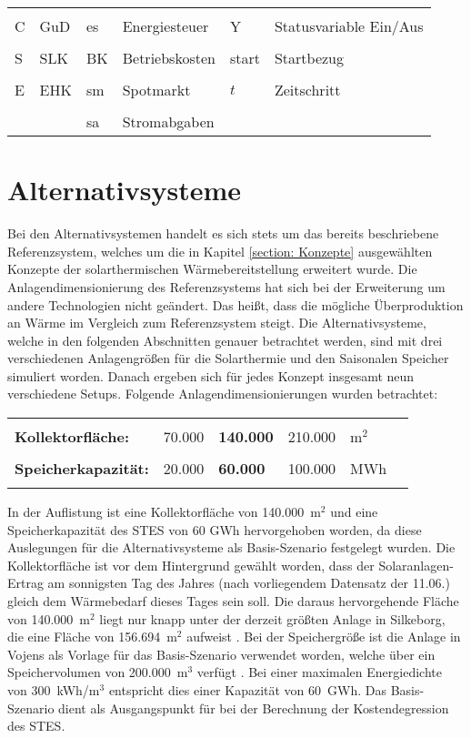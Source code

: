 	\begin{tabular}{llllll}
		&&&&&  \tabularnewline
		C & \acl{GuD} & es & Energiesteuer & Y & Statusvariable Ein/Aus\tabularnewline
		&&&&& \tabularnewline
		S & \acl{SLK} & BK & Betriebskosten & start & Startbezug\tabularnewline
		&&&&& \tabularnewline
		E & \acl{EHK} & sm & Spotmarkt & $t$ & Zeitschritt \tabularnewline
		&&&&&  \tabularnewline
		&  & sa & Stromabgaben &  & \tabularnewline
	\end{tabular}

\section{Alternativsysteme}
Bei den Alternativsystemen handelt es sich stets um das bereits beschriebene Referenzsystem, welches um die in Kapitel \ref{section: Konzepte} ausgewählten Konzepte der solarthermischen Wärmebereitstellung erweitert wurde. Die Anlagendimensionierung des Referenzsystems hat sich bei der Erweiterung um andere Technologien nicht geändert. Das heißt, dass die mögliche Überproduktion an Wärme im Vergleich zum Referenzsystem steigt. Die Alternativsysteme, welche in den folgenden Abschnitten genauer betrachtet werden, sind mit drei verschiedenen Anlagengrößen für die Solarthermie und den Saisonalen Speicher simuliert worden. Danach ergeben sich für jedes Konzept insgesamt neun verschiedene Setups. Folgende Anlagendimensionierungen wurden betrachtet:

	\begin{tabular}{llllll}
		&&&&&  \tabularnewline
		\textbf{Kollektorfläche:} & 70.000 & \textbf{140.000} & 210.000 & m$^2$  \tabularnewline
		&&&&& \tabularnewline
		\textbf{Speicherkapazität:} & 20.000 & \textbf{60.000} & 100.000 & MWh \tabularnewline
		&&&&& \tabularnewline	
	\end{tabular}

In der Auflistung ist eine Kollektorfläche von 140.000~m$^2$ und eine Speicherkapazität des \ac{STES} von 60 GWh hervorgehoben worden, da diese Auslegungen für die Alternativsysteme als Basis-Szenario festgelegt wurden. Die Kollektorfläche ist vor dem Hintergrund gewählt worden, dass der Solaranlagen-Ertrag am sonnigsten Tag des Jahres (nach vorliegendem Datensatz der 11.06.) gleich dem Wärmebedarf dieses Tages sein soll. Die daraus hervorgehende Fläche von 140.000~m$^2$ liegt nur knapp unter der derzeit größten Anlage in Silkeborg, die eine Fläche von 156.694~m$^2$ aufweist \cite{SDH2019}. Bei der Speichergröße ist die Anlage in Vojens als Vorlage für das Basis-Szenario verwendet worden, welche über ein Speichervolumen von 200.000~m$^3$ verfügt \cite{Arcon2019}. Bei einer maximalen Energiedichte von 300~kWh/m$^3$ \cite{Sterner2017} entspricht dies einer Kapazität von 60~GWh. Das Basis-Szenario dient als Ausgangspunkt für bei der Berechnung der Kostendegression des \ac{STES}.

